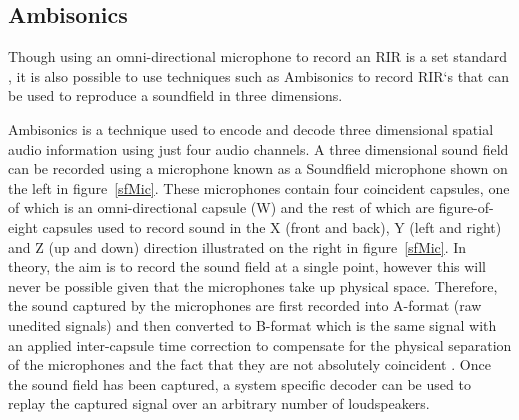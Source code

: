 \documentclass[../../main.tex]{subfiles}
\begin{document}
	\subsection{Ambisonics}



		Though using an omni-directional microphone to record an \ac{RIR} is a set standard \cite{ISO}, it is also possible to use techniques such as Ambisonics to record \ac{RIR}`s that can be used to reproduce a soundfield in three dimensions.

		Ambisonics is a technique used to encode and decode three dimensional spatial audio information using just four audio channels. A three dimensional sound field can be recorded using a microphone known as a Soundfield microphone shown on the left in figure~\ref{sfMic}. These microphones contain four coincident capsules, one of which is an omni-directional capsule (W) and the rest of which are figure-of-eight capsules used to record sound in the X (front and back), Y (left and right) and Z (up and down) direction illustrated on the right in figure~\ref{sfMic}. In theory, the aim is to record the sound field at a single point, however this will never be possible given that the microphones take up physical space. Therefore, the sound captured by the microphones are first recorded into A-format (raw unedited signals) and then converted to B-format which is the same signal with an applied inter-capsule time correction to compensate for the physical separation of the microphones \cite{sosAmbisonics} and the fact that they are not absolutely coincident \cite{Power}. Once the sound field has been captured, a system specific decoder can be used to replay the captured signal over an arbitrary number of loudspeakers.
\end{document}
